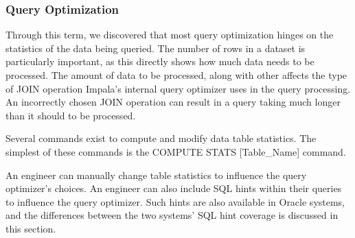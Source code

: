 \documentclass[onecolumn, draftclsnofoot,10pt, compsoc]{IEEEtran}
\begin{document}
\subsubsection{Query Optimization}
Through this term, we discovered that most query optimization hinges on the statistics of the data being queried.
The number of rows in a dataset is particularly important, as this directly shows how much data needs to be processed.
The amount of data to be processed, along with other  affects the type of JOIN operation Impala’s internal query optimizer uses in the query processing.
An incorrectly chosen JOIN operation can result in a query taking much longer than it should to be processed. 

Several commands exist to compute and modify data table statistics. The simplest of these commands is the COMPUTE STATS [Table\_Name] command. 

An engineer can manually change table statistics to influence the query optimizer’s choices.
An engineer can also include SQL hints within their queries to influence the query optimizer.
Such hints are also available in Oracle systems, and the differences between the two systems’ SQL hint coverage is discussed in this section.  
\end{document}

